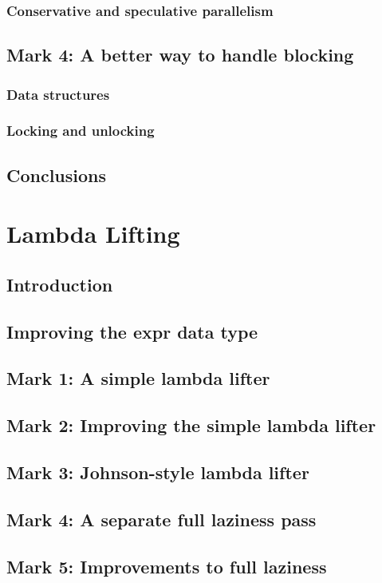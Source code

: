 \documentclass{jarticle}
\begin{document}
\subsubsection{Conservative and speculative parallelism}

\subsection{Mark 4: A better way to handle blocking}
\subsubsection{Data structures}
\subsubsection{Locking and unlocking}

\subsection{Conclusions}
\newpage

\section{Lambda Lifting}
\subsection{Introduction}
\subsection{Improving the expr data type}
\subsection{Mark 1: A simple lambda lifter}
\subsection{Mark 2: Improving the simple lambda lifter}
\subsection{Mark 3: Johnson-style lambda lifter}
\subsection{Mark 4: A separate full laziness pass}
\subsection{Mark 5: Improvements to full laziness}
\end{document}
